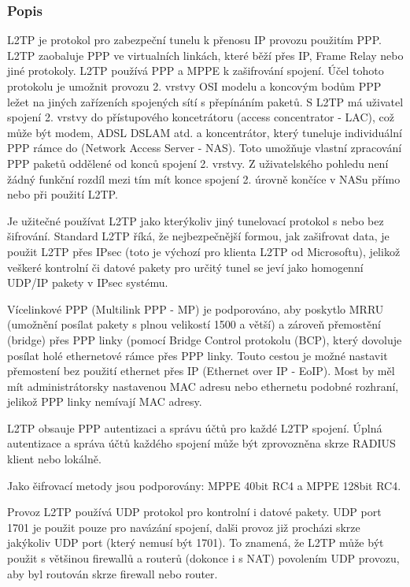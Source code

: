 \documentclass[thesis=B,czech]{FITthesis}[2012/06/26]
\begin{document}
      \subsubsection{Popis}
		L2TP je protokol pro zabezpeční tunelu k přenosu IP provozu použitím PPP. L2TP zaobaluje PPP ve virtualních linkách, které běží přes IP, Frame Relay nebo jiné protokoly.
		L2TP používá PPP a MPPE k zašifrování spojení. Účel tohoto protokolu je umožnit provozu 2. vrstvy OSI modelu a koncovým bodům PPP ležet na jiných zařízeních spojených sítí s přepínáním paketů. S L2TP má uživatel spojení 2. vrstvy do přístupového koncetrátoru (access concentrator - LAC), což může být modem, ADSL DSLAM atd. a koncentrátor, který tuneluje individuální PPP rámce do (Network Access Server - NAS). Toto umožňuje vlastní zpracování PPP paketů oddělené od konců spojení 2. vrstvy. Z uživatelského pohledu není žádný funkční rozdíl mezi tím mít konce spojení 2. úrovně končíce v NASu přímo nebo při použití L2TP.

		Je užitečné používat L2TP jako kterýkoliv jiný tunelovací protokol s nebo bez šifrování. Standard L2TP říká, že nejbezpečnější formou, jak zašifrovat data, je použit L2TP přes IPsec (toto je výchozí pro klienta L2TP od Microsoftu), jelikož veškeré kontrolní či datové pakety pro určitý tunel se jeví jako homogenní UDP/IP pakety v IPsec systému.

		Vícelinkové PPP (Multilink PPP - MP) je podporováno, aby poskytlo MRRU (umožnění posílat pakety s plnou velikostí 1500 a větší) a zároveň přemostění (bridge) přes PPP linky (pomocí Bridge Control protokolu (BCP), který dovoluje posílat holé ethernetové rámce přes PPP linky. Touto cestou je možné nastavit přemostení bez použití ethernet přes IP (Ethernet over IP - EoIP). Most by měl mít administrátorsky nastavenou MAC adresu nebo ethernetu podobné rozhraní, jelikož PPP linky nemívají MAC adresy.

		L2TP obsauje PPP autentizaci a správu účtů pro každé L2TP spojení. Úplná autentizace a správa účtů každého spojení může být zprovozněna skrze RADIUS klient nebo lokálně.

		Jako ěifrovací metody jsou podporovány: MPPE 40bit RC4 a MPPE 128bit RC4.

		Provoz L2TP používá UDP protokol pro kontrolní i datové pakety. UDP port 1701 je použit pouze pro navázání spojení, dalši provoz již procházi skrze jakýkoliv UDP port (který nemusí být 1701). To znamená, že L2TP může být použit s většinou firewallů a routerů (dokonce i s NAT) povolením UDP provozu, aby byl routován skrze firewall nebo router.
        \cite{l2tp_basics}
\end{document}
